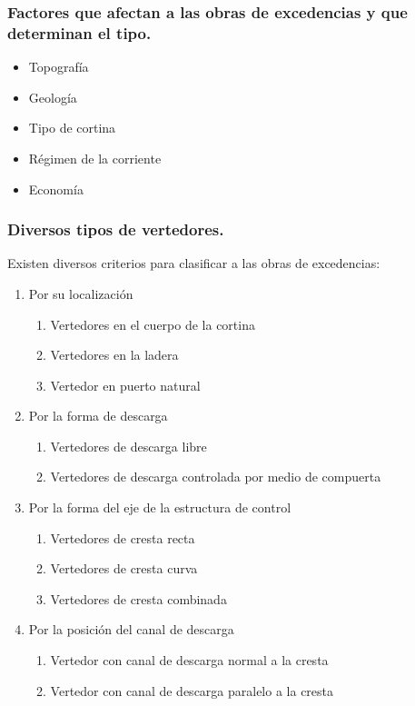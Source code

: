 \subsubsection{Factores que afectan a las obras de excedencias y que
	determinan el tipo.}

\begin{itemize}
	\item Topografía
	\item Geología
	\item Tipo de cortina
	\item Régimen de la corriente
	\item Economía
\end{itemize}

\subsubsection{Diversos tipos de vertedores.}

Existen diversos criterios para clasificar a las obras de excedencias:

\begin{enumerate}[noitemsep]
	\item Por su localización
	      \begin{enumerate}
		      \item Vertedores en el cuerpo de la cortina
		      \item Vertedores en la ladera
		      \item Vertedor en puerto natural
	      \end{enumerate}
	\item Por la forma de descarga
	      \begin{enumerate}
		      \item Vertedores de descarga libre
		      \item Vertedores de descarga controlada por medio de compuerta
	      \end{enumerate}
	\item Por la forma del eje de la estructura de control
	      \begin{enumerate}
		      \item Vertedores de cresta recta
		      \item Vertedores de cresta curva
		      \item Vertedores de cresta combinada
	      \end{enumerate}
	\item Por la posición del canal de descarga
	      \begin{enumerate}
		      \item Vertedor con canal de descarga normal a la cresta
		      \item Vertedor con canal de descarga paralelo a la cresta
	      \end{enumerate}
\end{enumerate}

